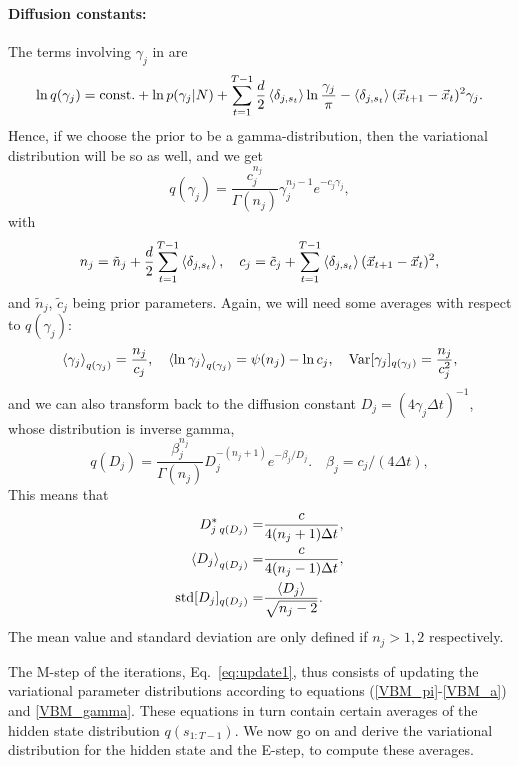 \paragraph{Diffusion constants:}
The terms involving $\gamma_j$ in  are
\begin{equation}
  \ln q(\gamma_j)=\mathrm{const.}
  +\ln p(\gamma_j|N)+\sum_{t=1}^{T-1}
  \frac d2\left\langle \delta_{j,s_t}\right\rangle\ln\frac{\gamma_j}{\pi}
  -\left\langle \delta_{j,s_t}\right\rangle(\vec{x}_{t+1}-\vec{x}_t)^2\gamma_j.
\end{equation}
Hence, if we choose the prior to be a gamma-distribution, then the
variational distribution will be so as well, and we get
\begin{equation}
  q(\gamma_j)=\frac{c_j^{n_j}}{\Gamma(n_j)}\gamma_j^{n_j-1}e^{-c_j\gamma_j},
\end{equation}
with
\begin{equation}\label{VBM_gamma}
  n_j=\tilde n_j+\frac d2\sum_{t=1}^{T-1}\left\langle \delta_{j,s_t}\right\rangle,\quad
  c_j=\tilde c_j+\sum_{t=1}^{T-1}\left\langle \delta_{j,s_t}\right\rangle(\vec{x}_{t+1}-\vec{x}_t)^2,
\end{equation}
and $\tilde n_j$, $\tilde c_j$ being prior parameters. Again, we will
need some averages with respect to $q(\gamma_j)$:
\begin{equation}\label{gammaprop}
  \left\langle \gamma_j\right\rangle_{q(\gamma_j)}=\frac{n_j}{c_j},\quad
  \left\langle \ln\gamma_j\right\rangle_{q(\gamma_j)}=\psi(n_j)-\ln c_j,\quad  
  \text{Var}[\gamma_j]_{q(\gamma_j)}=\frac{n_j}{c_j^2},
\end{equation}
and we can also transform back to the diffusion constant
$D_j=(4\gamma_j\Delta t)^{-1}$, whose distribution is inverse gamma,
\begin{equation}\label{eq:qD}
  q(D_j)=\frac{\beta_j^{n_j}}{\Gamma(n_j)}D_j^{-(n_j+1)}e^{-\beta_j/D_j}.
  \quad \beta_j=c_j/(4\Delta t),
\end{equation}
This means that
\begin{align}
  D^*_{j\;q(D_j)}=&\frac{c}{4(n_j+1)\Delta t},\\
  \left\langle D_j\right\rangle_{q(D_j)}=&\frac{c}{4(n_j-1)\Delta t},\\
  \text{std}[D_j]_{q(D_j)} =&\frac{\left\langle D_j\right\rangle}{\sqrt{n_j-2}}.
\end{align}
The mean value and standard deviation are only defined if $n_j>1,2$
respectively.

The M-step of the iterations, Eq.~\eqref{eq:update1}, thus consists of
updating the variational parameter distributions according to
equations (\ref{VBM_pi}-\ref{VBM_a}) and \eqref{VBM_gamma}. These
equations in turn contain certain averages of the hidden state
distribution $q(s_{1:T-1})$. We now go on and derive the variational
distribution for the hidden state and the E-step, to compute these
averages.
